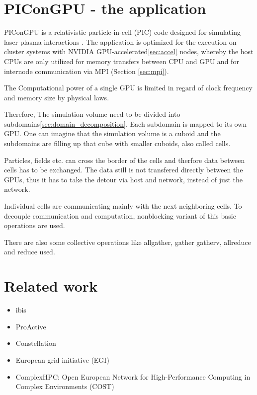 \section{PIConGPU - the application}
\label{sec:picongpu}
PIConGPU is a relativistic particle-in-cell (PIC) code designed for
simulating laser-plasma interactions \cite{ref:picongpu}. The
application is optimized for the execution on cluster systems with
NVIDIA GPU-accelerated\ref{sec:accel} nodes, whereby the host CPUs are
only utilized for memory transfers between CPU and GPU and for
internode communication via MPI (Section \ref{sec:mpi}).

The Computational power of a single GPU is limited in regard of clock
frequency and memory size by physical laws.

Therefore, The simulation volume need to be divided into
subdomains\ref{sec:domain_decomposition}. Each subdomain is mapped to
its own GPU. One can imagine that the simulation volume is a cuboid
and the subdomains are filling up that cube with smaller cuboids,
also called cells.

Particles, fields etc. can cross the border of the
cells and therfore data between cells has to be
exchanged. The data still is not transfered directly between 
the GPUs, thus it has to take the detour via host and network, instead
of just the network.

Individual cells are communicating mainly with the next
neighboring cells. To decouple communication and computation,
nonblocking variant of this basic operations are used.

 There are also some
collective operations like allgather, gather gatherv, allreduce and
reduce used.


\section{Related work}

\begin{itemize}
  \item ibis
  \item ProActive
  \item Constellation
  \item European grid initiative (EGI)
  \item ComplexHPC: Open European Network for High-Performance Computing in Complex Environments (COST)
\end{itemize}


\cleardoublepage

